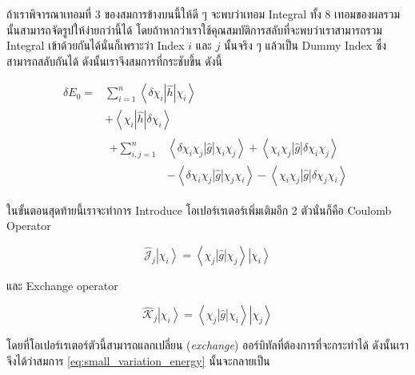 \noindent ถ้าเราพิจารณาเทอมที่ 3 ของสมการข้างบนนี้ให้ดี ๆ จะพบว่าเทอม Integral ทั้ง 8 เทอมของผลรวมนั้นสามารถจัดรูปให้ง่ายกว่านี้ได้
โดยถ้าหากว่าเราใช้คุณสมบัติการสลับที่จะพบว่าเราสามารถรวม Integral เข้าด้วยกันได้นั่นก็เพราะว่า Index $i$ และ $j$ นั้นจริง ๆ แล้วเป็น
Dummy Index ซึ่งสามารถสลับกันได้ ดังนั้นเราจึงสมการที่กระชับขึ้น ดังนี้

\begin{equation}
    \label{eq:small_variation_energy}
    \begin{aligned}
        \delta E_0
        = & \sum_{i=1}^n\left\langle\delta \chi_i|\hat{h}| \chi_i\right\rangle       \\
          & +\left\langle\chi_i|\hat{h}| \delta \chi_i\right\rangle                  \\
          & \begin{aligned} +\sum_{i, j=1}^n
                 & \left\langle \delta \chi_i \chi_j|\hat{g}| \chi_i \chi_j\right\rangle
                +\left\langle\chi_i \chi_j|\hat{g}| \delta \chi_i \chi_j\right\rangle    \\
                 & -\left\langle\delta \chi_i \chi_j|\hat{g}| \chi_j \chi_i\right\rangle
                -\left\langle\chi_i \chi_j|\hat{g}| \delta \chi_j \chi_i\right\rangle
            \end{aligned}
    \end{aligned}
\end{equation}

ในขั้นตอนสุดท้ายนี้เราจะทำการ Introduce โอเปอร์เรเตอร์เพิ่มเติมอีก 2 ตัวนั่นก็คือ Coulomb Operator

\begin{equation}
    \label{eq:coulomb_operator}
    \hat{\mathscr{J}}_j\left|\chi_i\right\rangle
    = \left\langle\chi_j|\hat{g}| \chi_j\right\rangle
    \left|\chi_i\right\rangle
\end{equation}

\noindent และ Exchange operator

\begin{equation}
    \label{eq:exchange_operator}
    \hat{\mathscr{K}}_j\left|\chi_i\right\rangle
    = \left\langle\chi_j|\hat{g}| \chi_i\right\rangle
    \left|\chi_j\right\rangle
\end{equation}

\noindent โดยที่โอเปอร์เรเตอร์ตัวนี้สามารถแลกเปลี่ยน (\textit{exchange}) ออร์บิทัลที่ต้องการที่จะกระทำได้ ดังนั้นเราจึงได้ว่าสมการ
\ref{eq:small_variation_energy} นั้นจะกลายเป็น

